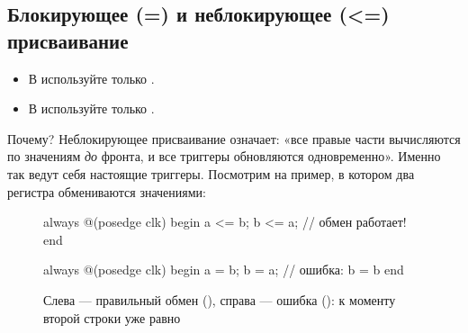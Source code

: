 \subsection{Блокирующее (=) и неблокирующее (<=) присваивание}

\begin{warnbox}
\begin{itemize}
  \item В  используйте только \code{<=}.
  \item В  используйте только \code{=}.
\end{itemize}
\end{warnbox}

Почему? Неблокирующее присваивание \code{<=} означает: «все правые части
вычисляются по значениям \emph{до} фронта, и все триггеры обновляются
одновременно». Именно так ведут себя настоящие триггеры. Посмотрим на
пример, в котором два регистра обмениваются значениями:

\begin{figure}[H]
\centering
\begin{minipage}{0.47\textwidth}
\begin{vcode}
always @(posedge clk) begin
    a <= b;
    b <= a;   // обмен работает!
end
\end{vcode}
\centering
{}
\end{minipage}\hfill
\begin{minipage}{0.47\textwidth}
\begin{vcode}
always @(posedge clk) begin
    a = b;
    b = a;    // ошибка: b = b
end
\end{vcode}
\centering
{}
\end{minipage}
\caption{Слева --- правильный обмен (\code{<=}), справа --- ошибка (\code{=}):
к моменту второй строки  уже равно }
\end{figure}

